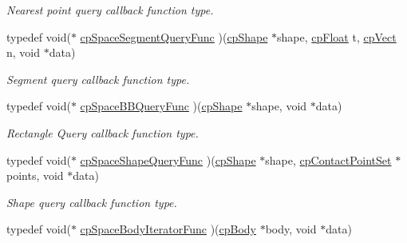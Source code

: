 \begin{DoxyCompactItemize}
\begin{DoxyCompactList}\small\item\em Nearest point query callback function type. \end{DoxyCompactList}\item 
\hypertarget{group__cp_space_gad48eefc60cdccc027c68b1f696e75838}{typedef void($\ast$ \hyperlink{group__cp_space_gad48eefc60cdccc027c68b1f696e75838}{cp\-Space\-Segment\-Query\-Func} )(\hyperlink{structcp_shape}{cp\-Shape} $\ast$shape, \hyperlink{group__basic_types_gac1ed65573e035bf892505768c852d8d3}{cp\-Float} t, \hyperlink{structcp_vect}{cp\-Vect} n, void $\ast$data)}\label{group__cp_space_gad48eefc60cdccc027c68b1f696e75838}

\begin{DoxyCompactList}\small\item\em Segment query callback function type. \end{DoxyCompactList}\item 
\hypertarget{group__cp_space_ga9f9d412c914ddec134554dde01dffbad}{typedef void($\ast$ \hyperlink{group__cp_space_ga9f9d412c914ddec134554dde01dffbad}{cp\-Space\-B\-B\-Query\-Func} )(\hyperlink{structcp_shape}{cp\-Shape} $\ast$shape, void $\ast$data)}\label{group__cp_space_ga9f9d412c914ddec134554dde01dffbad}

\begin{DoxyCompactList}\small\item\em Rectangle Query callback function type. \end{DoxyCompactList}\item 
\hypertarget{group__cp_space_gaef86eb47a5ac16c373eb8b59599d1806}{typedef void($\ast$ \hyperlink{group__cp_space_gaef86eb47a5ac16c373eb8b59599d1806}{cp\-Space\-Shape\-Query\-Func} )(\hyperlink{structcp_shape}{cp\-Shape} $\ast$shape, \hyperlink{structcp_contact_point_set}{cp\-Contact\-Point\-Set} $\ast$points, void $\ast$data)}\label{group__cp_space_gaef86eb47a5ac16c373eb8b59599d1806}

\begin{DoxyCompactList}\small\item\em Shape query callback function type. \end{DoxyCompactList}\item 
\hypertarget{group__cp_space_gac0cc4ac612fc81b31e3179b8a742570e}{typedef void($\ast$ \hyperlink{group__cp_space_gac0cc4ac612fc81b31e3179b8a742570e}{cp\-Space\-Body\-Iterator\-Func} )(\hyperlink{structcp_body}{cp\-Body} $\ast$body, void $\ast$data)}\label{group__cp_space_gac0cc4ac612fc81b31e3179b8a742570e}


\end{DoxyCompactItemize}
